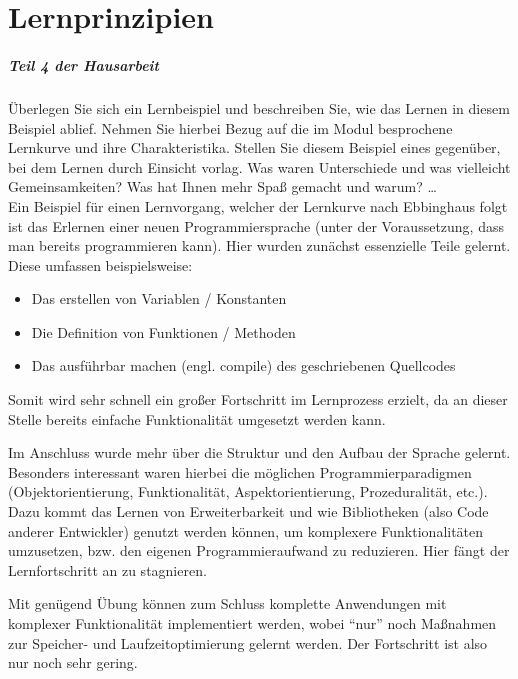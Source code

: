 %
\chapter{Lernprinzipien}
\label{sec:lernprinzipien}

\paragraph{Teil 4 der Hausarbeit}
Überlegen Sie sich ein Lernbeispiel und beschreiben Sie, wie das Lernen in diesem Beispiel ablief. Nehmen Sie hierbei Bezug auf die im Modul besprochene Lernkurve und ihre Charakteristika. Stellen Sie diesem Beispiel eines gegenüber, bei dem Lernen durch Einsicht vorlag. Was waren Unterschiede und was vielleicht Gemeinsamkeiten? Was hat Ihnen mehr Spaß gemacht und warum? … \\[0.4em]

Ein Beispiel für einen Lernvorgang, welcher der Lernkurve nach Ebbinghaus folgt ist das Erlernen einer neuen Programmiersprache (unter der Voraussetzung, dass man bereits programmieren kann). Hier wurden zunächst essenzielle Teile gelernt. Diese umfassen beispielsweise:

\begin{itemize}
    \item Das erstellen von Variablen / Konstanten
    \item Die Definition von Funktionen / Methoden
    \item Das ausführbar machen (engl. compile) des geschriebenen Quellcodes
\end{itemize}

Somit wird sehr schnell ein großer Fortschritt im Lernprozess erzielt, da an dieser Stelle bereits einfache Funktionalität umgesetzt werden kann.

Im Anschluss wurde mehr über die Struktur und den Aufbau der Sprache gelernt. Besonders interessant waren hierbei die möglichen Programmierparadigmen (Objektorientierung, Funktionalität, Aspektorientierung, Prozeduralität, etc.). Dazu kommt das Lernen von Erweiterbarkeit und wie Bibliotheken (also Code anderer Entwickler) genutzt werden können, um komplexere Funktionalitäten umzusetzen, bzw. den eigenen Programmieraufwand zu reduzieren.
Hier fängt der Lernfortschritt an zu stagnieren.

Mit genügend Übung können zum Schluss komplette Anwendungen mit komplexer Funktionalität implementiert werden, wobei “nur” noch Maßnahmen zur Speicher- und Laufzeitoptimierung gelernt werden. Der Fortschritt ist also nur noch sehr gering.

